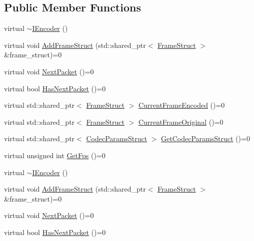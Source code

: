 \subsection*{Public Member Functions}
\begin{DoxyCompactItemize}
\item 
virtual \hyperlink{classmoetsi_1_1ssp_1_1IEncoder_a6c19808ebe6a05dbce630c45188b9346}{$\sim$\+I\+Encoder} ()
\item 
virtual void \hyperlink{classmoetsi_1_1ssp_1_1IEncoder_a8c223ec82fdd30ee8ee75157306054ec}{Add\+Frame\+Struct} (std\+::shared\+\_\+ptr$<$ \hyperlink{structmoetsi_1_1ssp_1_1FrameStruct}{Frame\+Struct} $>$ \&frame\+\_\+struct)=0
\item 
virtual void \hyperlink{classmoetsi_1_1ssp_1_1IEncoder_afac3ddcf2f49be16020c83cb9e0fb274}{Next\+Packet} ()=0
\item 
virtual bool \hyperlink{classmoetsi_1_1ssp_1_1IEncoder_a2af8e23d841ef61f6ee4037e56a3694d}{Has\+Next\+Packet} ()=0
\item 
virtual std\+::shared\+\_\+ptr$<$ \hyperlink{structmoetsi_1_1ssp_1_1FrameStruct}{Frame\+Struct} $>$ \hyperlink{classmoetsi_1_1ssp_1_1IEncoder_a178d117518e7c7007414ea9c82bd3ed6}{Current\+Frame\+Encoded} ()=0
\item 
virtual std\+::shared\+\_\+ptr$<$ \hyperlink{structmoetsi_1_1ssp_1_1FrameStruct}{Frame\+Struct} $>$ \hyperlink{classmoetsi_1_1ssp_1_1IEncoder_ab60bdaae0a85289dfa31a12bab533dc0}{Current\+Frame\+Original} ()=0
\item 
virtual std\+::shared\+\_\+ptr$<$ \hyperlink{structmoetsi_1_1ssp_1_1CodecParamsStruct}{Codec\+Params\+Struct} $>$ \hyperlink{classmoetsi_1_1ssp_1_1IEncoder_ad5179efaa4c74207766dd64f46f4059a}{Get\+Codec\+Params\+Struct} ()=0
\item 
virtual unsigned int \hyperlink{classmoetsi_1_1ssp_1_1IEncoder_ae6a865aa52230d81aed1cb5232402f6c}{Get\+Fps} ()=0
\item 
virtual \hyperlink{classmoetsi_1_1ssp_1_1IEncoder_a6c19808ebe6a05dbce630c45188b9346}{$\sim$\+I\+Encoder} ()
\item 
virtual void \hyperlink{classmoetsi_1_1ssp_1_1IEncoder_a8c223ec82fdd30ee8ee75157306054ec}{Add\+Frame\+Struct} (std\+::shared\+\_\+ptr$<$ \hyperlink{structmoetsi_1_1ssp_1_1FrameStruct}{Frame\+Struct} $>$ \&frame\+\_\+struct)=0
\item 
virtual void \hyperlink{classmoetsi_1_1ssp_1_1IEncoder_afac3ddcf2f49be16020c83cb9e0fb274}{Next\+Packet} ()=0
\item 
virtual bool \hyperlink{classmoetsi_1_1ssp_1_1IEncoder_a2af8e23d841ef61f6ee4037e56a3694d}{Has\+Next\+Packet} ()=0

\end{DoxyCompactItemize}
